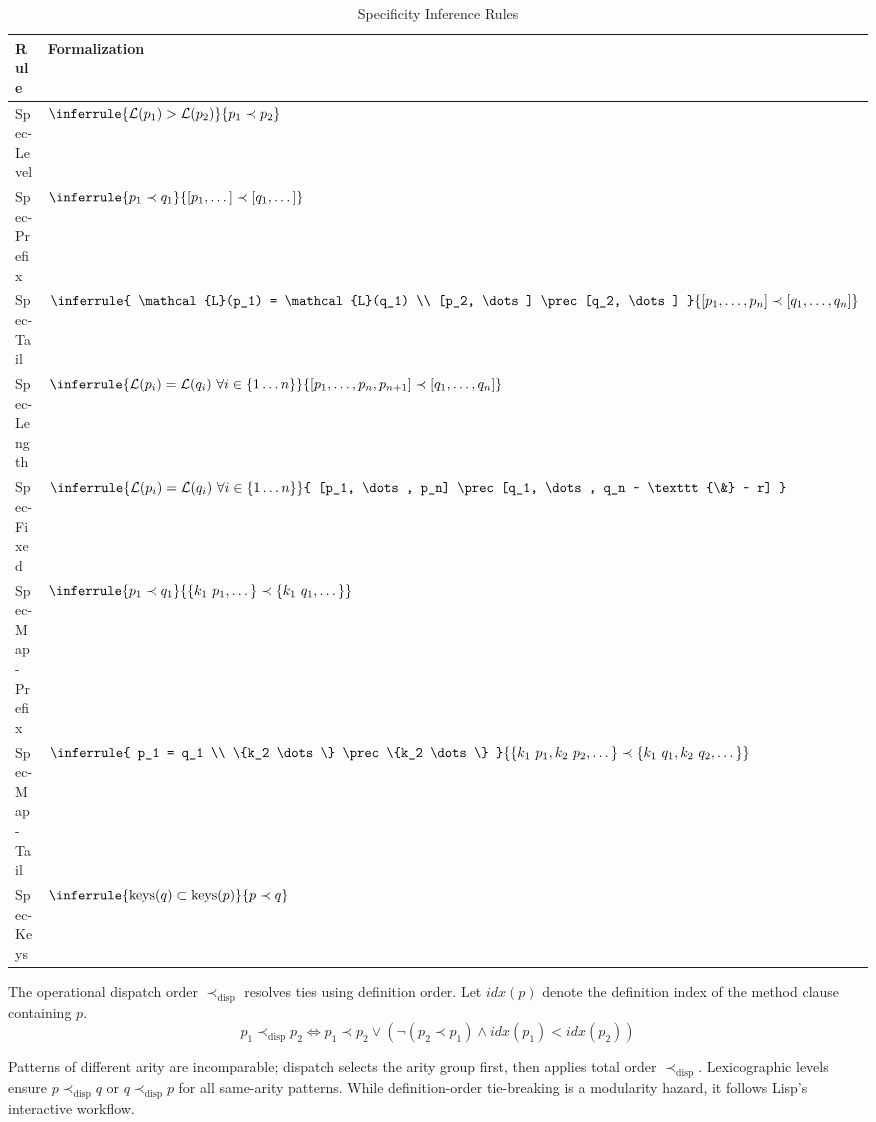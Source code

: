 \documentclass[sigconf,nonacm]{acmart}
\begin{document}
\begin{table}[htbp]
\caption{Specificity Inference Rules}
\label{tab:spec-rules}
\small
\begin{tabularx}{\columnwidth}{lX}
\toprule
\textbf{Rule} & \textbf{Formalization} \\
\midrule
Spec-Level & $\inferrule{ \mathcal{L}(p_1) > \mathcal{L}(p_2) }{ p_1 \prec p_2 }$ \\ \addlinespace
Spec-Prefix & $\inferrule{ p_1 \prec q_1 }{ [p_1, \dots] \prec [q_1, \dots] }$ \\ \addlinespace
Spec-Tail & $\inferrule{ \mathcal{L}(p_1) = \mathcal{L}(q_1) \\ [p_2, \dots] \prec [q_2, \dots] }{ [p_1, \dots, p_n] \prec [q_1, \dots, q_n] }$ \\ \addlinespace
Spec-Length & $\inferrule{ \mathcal{L}(p_i) = \mathcal{L}(q_i) ~ \forall i \in \{1 \dots n\} }{ [p_1, \dots, p_n, p_{n+1}] \prec [q_1, \dots, q_n] }$ \\ \addlinespace
Spec-Fixed & $\inferrule{ \mathcal{L}(p_i) = \mathcal{L}(q_i) ~ \forall i \in \{1 \dots n\} }{ [p_1, \dots, p_n] \prec [q_1, \dots, q_n ~ \texttt{\&} ~ r] }$ \\ \addlinespace
Spec-Map-Prefix & $\inferrule{ p_1 \prec q_1 }{ \{k_1 ~ p_1, \dots\} \prec \{k_1 ~ q_1, \dots\} }$ \\ \addlinespace
Spec-Map-Tail & $\inferrule{ p_1 = q_1 \\ \{k_2 \dots\} \prec \{k_2 \dots\} }{ \{k_1 ~ p_1, k_2 ~ p_2, \dots\} \prec \{k_1 ~ q_1, k_2 ~ q_2, \dots\} }$ \\ \addlinespace
Spec-Keys & $\inferrule{ \text{keys}(q) \subset \text{keys}(p) }{ p \prec q }$ \\
\bottomrule
\end{tabularx}
\end{table}

The operational dispatch order $\prec_{\text{disp}}$ resolves ties using definition order. Let $\textit{idx}(p)$ denote the definition index of the method clause containing $p$.
\[
  p_1 \prec_{\text{disp}} p_2 \iff p_1 \prec p_2 \lor (\neg(p_2 \prec p_1) \land \textit{idx}(p_1) < \textit{idx}(p_2))
\]

Patterns of different arity are incomparable; dispatch selects the arity group first, then applies total order $\prec_{\text{disp}}$. Lexicographic levels ensure $p \prec_{\text{disp}} q$ or $q \prec_{\text{disp}} p$ for all same-arity patterns. While definition-order tie-breaking is a modularity hazard, it follows Lisp's interactive workflow.
\end{document}
